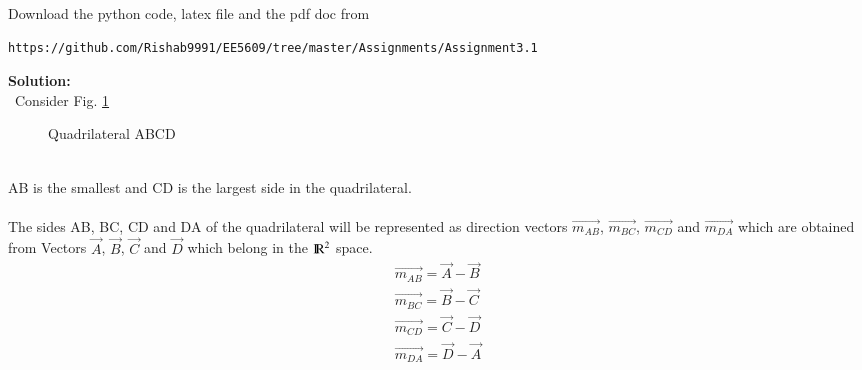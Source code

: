 \documentclass[journal,12pt,twocolumn]{IEEEtran}
\begin{document}
%
Download the python code, latex file and the pdf doc from 
\begin{lstlisting}
https://github.com/Rishab9991/EE5609/tree/master/Assignments/Assignment3.1
\end{lstlisting}
\textbf{Solution:}
\\\ Consider Fig. \ref{Fig:1}
\begin{figure}[!ht]
    \centering
     \caption{Quadrilateral ABCD}
     \label{Fig:1}
\end{figure}
\\
AB is the smallest and CD is the largest side in the quadrilateral.\\\\
The sides AB, BC, CD and DA of the quadrilateral will be represented as direction vectors $\vec{m_{AB}}$, $\vec{m_{BC}}$, $\vec{m_{CD}}$ and $\vec{m_{DA}}$ which are obtained from Vectors $\vec{A}$, $\vec{B}$, $\vec{C}$ and $\vec{D}$ which belong in the ${\rm I\!R}^2$ space. 
\begin{align}
   \vec{m_{AB}} = \vec{A} - \vec{B}\\ 
   \vec{m_{BC}} = \vec{B} - \vec{C}\\
   \vec{m_{CD}} = \vec{C} - \vec{D}\\
   \vec{m_{DA}} = \vec{D} - \vec{A}
\end{align}\\
\end{document}

